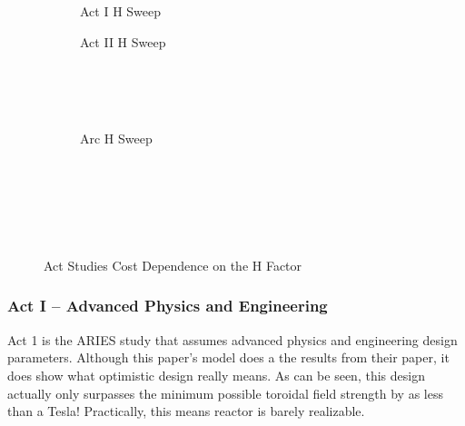 \begin{figure*}[h!]
    \centering
    \hfill 
    \begin{subfigure}[t]{0.4\textwidth}
        \centering
    \begin{adjustbox}{width=\textwidth}
      \Large
      
    \end{adjustbox}
        \caption{Act I H Sweep}
    \end{subfigure}
    \hfill
    \begin{subfigure}[t]{0.4\textwidth}
        \centering
    \begin{adjustbox}{width=\textwidth}
      \Large
      
    \end{adjustbox}
        \caption{Act II H Sweep}
    \end{subfigure}
    \hfill \hfill ~\\ ~\\ ~\\
    \begin{subfigure}[t]{0.4\textwidth}
        \centering
		\begin{adjustbox}{width=\textwidth}
			\Large
			
		\end{adjustbox}
        \caption{Arc H Sweep}
    \end{subfigure} ~\\ ~\\ ~\\
    \caption{Act Studies Cost Dependence on the H Factor} ~\\    
	\label{fig:act_h_cost}
\end{figure*}

\subsubsection{Act I -- Advanced Physics and Engineering}

Act 1 is the ARIES study that assumes advanced physics and engineering design parameters. Although this paper's model does a  the results from their paper, it does show what optimistic design really means. As can be seen, this design actually only surpasses the minimum possible toroidal field strength by as less than a Tesla! Practically, this means  reactor is barely realizable. 

